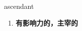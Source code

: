
\begin{frame}
{\huge ascendant}
\begin{center}
\begin{enumerate}\Large
  \item \textbf{有影响力的，主宰的}
\end{enumerate}
\end{center}
\end{frame}
